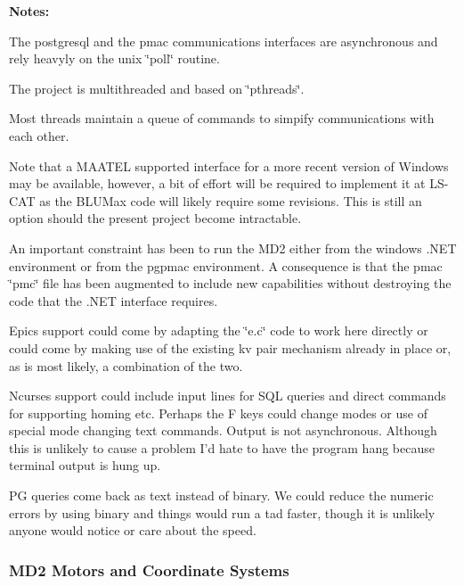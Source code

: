 {\bfseries Notes\-:} 
\begin{DoxyItemize}
\item The postgresql and the pmac communications interfaces are asynchronous and rely heavyly on the unix \char`\"{}poll\char`\"{} routine. 


\item The project is multithreaded and based on \char`\"{}pthreads\char`\"{}.


\item Most threads maintain a queue of commands to simpify communications with each other.


\item Note that a M\-A\-A\-T\-E\-L supported interface for a more recent version of Windows may be available, however, a bit of effort will be required to implement it at L\-S-\/\-C\-A\-T as the B\-L\-U\-Max code will likely require some revisions. This is still an option should the present project become intractable.


\item An important constraint has been to run the M\-D2 either from the windows .N\-E\-T environment or from the pgpmac environment. A consequence is that the pmac \char`\"{}pmc\char`\"{} file has been augmented to include new capabilities without destroying the code that the .N\-E\-T interface requires.


\item Epics support could come by adapting the \char`\"{}e.\-c\char`\"{} code to work here directly or could come by making use of the existing kv pair mechanism already in place or, as is most likely, a combination of the two.


\item Ncurses support could include input lines for S\-Q\-L queries and direct commands for supporting homing etc. Perhaps the F keys could change modes or use of special mode changing text commands. Output is not asynchronous. Although this is unlikely to cause a problem I'd hate to have the program hang because terminal output is hung up.


\item P\-G queries come back as text instead of binary. We could reduce the numeric errors by using binary and things would run a tad faster, though it is unlikely anyone would notice or care about the speed. 


\end{DoxyItemize}

\subsubsection*{M\-D2 Motors and Coordinate Systems}


